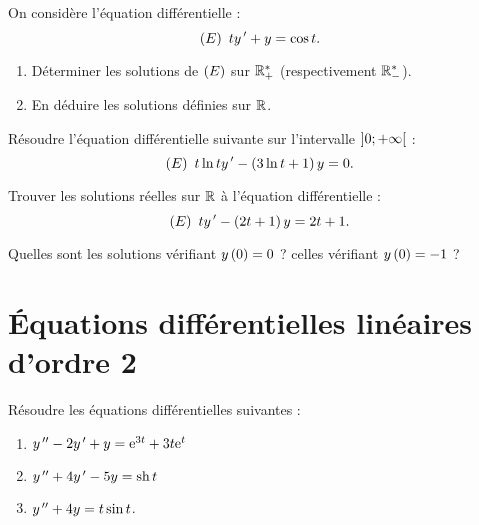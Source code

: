 \begin{exo}[Exercice 6]
On considère l'équation différentielle : \[\left(E\right)~ty^{\,\prime}+y=\cos t.\]

\begin{enumerate}
    \item Déterminer les solutions de \(\left(E\right)\) sur \(\mathbb{R}_+^*\) (respectivement \(\mathbb{R}_-^*\)). \\
    \item En déduire les solutions définies sur \(\mathbb{R}\).
\end{enumerate}
\end{exo}

\begin{corr}
\end{corr}

\begin{exo}
Résoudre l'équation différentielle suivante sur l'intervalle \(\left]0;+\infty\right[\) : \[\left(E\right)~t\ln ty^{\,\prime}-\left(3\ln t+1\right)y=0.\]
\end{exo}

\begin{corr}
\end{corr}

\begin{exo}[Exercice 8]
Trouver les solutions réelles sur \(\mathbb{R}\) à l'équation différentielle : \[\left(E\right)~ty^{\,\prime}-\left(2t+1\right)y=2t+1.\]

Quelles sont les solutions vérifiant \(y\left(0\right)=0\) ? celles vérifiant \(y\left(0\right)=-1\) ?
\end{exo}

\begin{corr}
\end{corr}

\section{Équations différentielles linéaires d'ordre 2}

\begin{exo}[Exercice 9]
Résoudre les équations différentielles suivantes :

\begin{enumerate}
    \item \(y^{\,\prime\prime}-2y^{\,\prime}+y=\mathrm{e}^{3t}+3t\mathrm{e}^{t}\) \\
    \item \(y^{\,\prime\prime}+4y^{\,\prime}-5y=\operatorname{sh} t\) \\
    \item \(y^{\,\prime\prime}+4y=t\sin t\).
\end{enumerate}
\end{exo}


